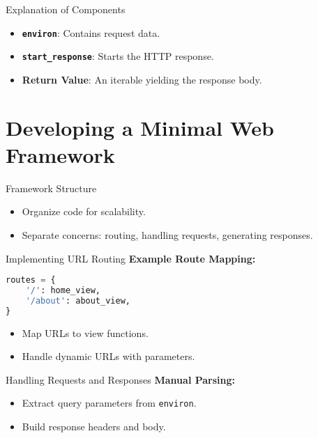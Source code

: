 \documentclass{beamer}
\begin{document}
\begin{frame}{Explanation of Components}
    \begin{itemize}
        \item \textbf{\texttt{environ}}: Contains request data.
        \item \textbf{\texttt{start\_response}}: Starts the HTTP response.
        \item \textbf{Return Value}: An iterable yielding the response body.
    \end{itemize}
\end{frame}

\section{Developing a Minimal Web Framework}

\begin{frame}{Framework Structure}
    \begin{itemize}
        \item Organize code for scalability.
        \item Separate concerns: routing, handling requests, generating responses.
    \end{itemize}
\end{frame}

\begin{frame}[fragile]{Implementing URL Routing}
    \textbf{Example Route Mapping:}
    \begin{lstlisting}[language=Python]
routes = {
    '/': home_view,
    '/about': about_view,
}
    \end{lstlisting}
    \begin{itemize}
        \item Map URLs to view functions.
        \item Handle dynamic URLs with parameters.
    \end{itemize}
\end{frame}

\begin{frame}[fragile]{Handling Requests and Responses}
    \textbf{Manual Parsing:}
    \begin{itemize}
        \item Extract query parameters from \texttt{environ}.
        \item Build response headers and body.
    \end{itemize}
\end{frame}
\end{document}
